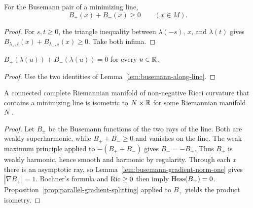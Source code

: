 \begin{lemma}
\label{lem:busemann-pair-nonneg}






For the Busemann pair of a minimizing line,
$$B_+(x)+B_-(x)\ge0\qquad(x\in M).$$
\end{lemma}
\begin{proof}
\sketch

For $s,t\ge0$, the triangle inequality between $\lambda(-s)$,
$x$, and $\lambda(t)$ gives
$B_{\lambda_+,t}(x)+B_{\lambda_-,s}(x)\ge0$. Take both infima.
\end{proof}

\begin{corollary}
\label{cor:busemann-pair-vanishes-on-line}





$B_+(\lambda(u))+B_-(\lambda(u))=0$ for every $u\in\mathbb{R}$.
\end{corollary}
\begin{proof}
\sketch

Use the two identities of Lemma~\ref{lem:busemann-along-line}.
\end{proof}

\begin{lemma}
\label{lem:minimizing-line-implies-product}
\label{line}


A connected complete Riemannian manifold of non-negative Ricci
curvature that contains a minimizing line is isometric to
$N\times\mathbb{R}$ for some Riemannian manifold $N$
\cite{CheegerGromoll2}.
\end{lemma}
\begin{proof}
\sketch
{}
Let $B_\pm$ be the Busemann functions of the two rays of the line.
Both are weakly superharmonic, while $B_++B_-\ge0$ and vanishes on the
line. The weak maximum principle applied to $-(B_++B_-)$ gives
$B_-=-B_+$. Thus $B_+$ is weakly harmonic, hence smooth and harmonic by
regularity. Through each $x$ there is an asymptotic ray, so
Lemma~\ref{lem:busemann-gradient-norm-one} gives
$|\nabla B_+|=1$. Bochner's formula and $\operatorname{Ric}\ge0$ then imply
$\operatorname{Hess}(B_+)=0$. Proposition~\ref{prop:parallel-gradient-splitting}
applied to $B_+$ yields the product isometry.
\end{proof}

